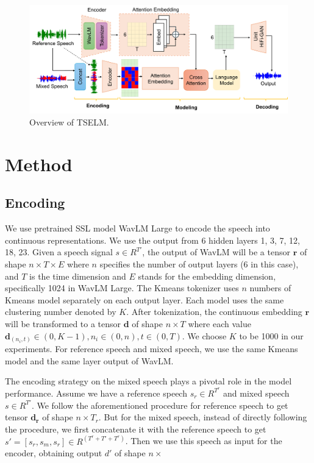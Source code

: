 \documentclass[conference]{IEEEtran}
\begin{document}
\begin{figure}[t]
\centering
\includegraphics[width=\textwidth]{assets/model.pdf}
\caption{Overview of TSELM.}
\label{model}
\end{figure}

\section{Method}

\subsection{Encoding}
We use pretrained SSL model WavLM Large \cite{wavlm} to 
encode the speech into continuous representations. We use the output from 6 hidden 
layers 1, 3, 7, 12, 18, 23. Given a speech signal \(s \in R^{T'} \), the output 
of WavLM will be a tensor \(\bm{r}\) of shape \(n \times T \times E\) where 
\(n\) specifies the number 
of output layers (6 in this case), and  \(T\) is the time 
dimension and \(E\) stands for the 
embedding dimension, specifically 1024 in WavLM Large. The Kmeans tokenizer uses \(n\) numbers of  Kmeans model 
separately on each output layer. Each model uses the same clustering number denoted by \(K\).
After tokenization, the continuous embedding \(\bm{r}\) will be transformed to a tensor \(\bm{d}\) of shape \(n \times T\) where each value \(\bm{d}_{(n_i,t)} \in (0, K-1), n_i \in (0,n), t \in 
(0, T)\). We choose \(K\) to be 1000 in our experiments. For reference speech and mixed speech, we 
use the same Kmeans model and the same layer output of WavLM. 

The encoding strategy on the mixed speech plays a pivotal role in the model performance. Assume we 
have a reference speech \(s_r \in R^{T^r} \) and mixed speech \(s \in R^{T'}\). 
We follow the 
aforementioned procedure for 
reference speech to get tensor \(\bm{d_r}\) of shape \(n \times T_r\). But for the mixed 
speech, instead of directly following the procedure, we first concatenate it with 
the reference speech to get \(s' = [s_r, s_m, s_r] \in R^{(T^r+T'+T^r)}\). Then we use this speech 
as input for the encoder, obtaining output \(d'\) of shape \(n \times \)
\end{document}
